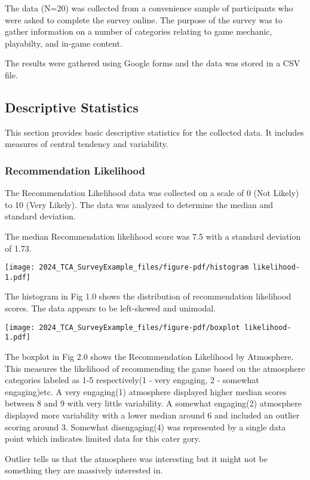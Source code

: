 \documentclass[
  letterpaper,
  DIV=11,
  numbers=noendperiod]{scrartcl}
\begin{document}
The data (N=20) was collected from a convenience sample of participants
who were asked to complete the survey online. The purpose of the survey
was to gather information on a number of categories relating to game
mechanic, playabilty, and in-game content.

The results were gathered using Google forms and the data was stored in
a CSV file.

\subsection{Descriptive Statistics}\label{descriptive-statistics}

This section provides basic descriptive statistics for the collected
data. It includes measures of central tendency and variability.

\subsubsection{Recommendation
Likelihood}\label{recommendation-likelihood}

The Recommendation Likelihood data was collected on a scale of 0 (Not
Likely) to 10 (Very Likely). The data was analyzed to determine the
median and standard deviation.

The median Recommendation likelihood score was 7.5 with a standard
deviation of 1.73.

\texttt{[image: 2024\_TCA\_SurveyExample\_files/figure-pdf/histogram likelihood-1.pdf]}

The histogram in Fig 1.0 shows the distribution of recommendation
likelihood scores. The data appears to be left-skewed and unimodal.

\texttt{[image: 2024\_TCA\_SurveyExample\_files/figure-pdf/boxplot likelihood-1.pdf]}

The boxplot in Fig 2.0 shows the Recommendation Likelihood by
Atmosphere. This measures the likelihood of recommending the game based
on the atmosphere categories labeled as 1-5 respectively(1 - very
engaging, 2 - somewhat engaging)etc. A very engaging(1) atmosphere
displayed higher median scores between 8 and 9 with very little
variability. A somewhat engaging(2) atmosphere displayed more
variability with a lower median around 6 and included an outlier scoring
around 3. Somewhat disengaging(4) was represented by a single data point
which indicates limited data for this cater gory.

Outlier tells us that the atmosphere was interesting but it might not be
something they are massively interested in.
\end{document}
